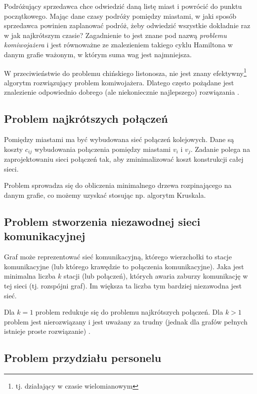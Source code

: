 Podróżujący sprzedawca chce odwiedzić daną listę miast i powrócić do punktu początkowego. Mając dane czasy podróży pomiędzy miastami, w jaki sposób sprzedawca powinien zaplanować podróż, żeby odwiedzić wszystkie dokładnie raz w jak najkrótszym czasie? Zagadnienie to jest znane pod nazwą \emph{problemu komiwojażera} i jest równoważne ze znalezieniem takiego cyklu Hamiltona w danym grafie ważonym, w którym suma wag jest najmniejsza.

W przeciwieństwie do problemu chińskiego listonosza, nie jest znany efektywny\footnote{tj. działający w czasie wielomianowym} algorytm rozwiązujący problem komiwojażera. Dlatego często pożądane jest znalezienie odpowiednio dobrego (ale niekoniecznie najlepszego) rozwiązania \cite[65]{bondy}. 


\subsection*{Problem najkrótszych połączeń}

Pomiędzy miastami ma być wybudowana sieć połączeń kolejowych. Dane są koszty $c_{ij}$ wybudowania połączenia pomiędzy miastami $v_i$ i $v_j$. Zadanie polega na zaprojektowaniu sieci połączeń tak, aby zminimalizować koszt konstrukcji całej sieci. 

Problem sprowadza się do obliczenia minimalnego drzewa rozpinającego na danym grafie, co możemy uzyskać stosując np. algorytm Kruskala.


\subsection*{Problem stworzenia niezawodnej sieci komunikacyjnej}

Graf może reprezentować sieć komunikacyjną, którego wierzchołki to stacje komunikacyjne (lub którego krawędzie to połączenia komunikacyjne). Jaka jest minimalna liczba $k$ stacji (lub połączeń), których awaria zaburzy komunikację w tej sieci (tj. rozspójni graf). Im większa ta liczba tym bardziej niezawodna jest sieć. 

Dla $k=1$ problem redukuje się do problemu najkrótszych połączeń. Dla $k>1$ problem jest nierozwiązany i jest uważany za trudny (jednak dla grafów pełnych istnieje proste rozwiązanie) \cite[48]{bondy}. 


\subsection*{Problem przydziału personelu}


